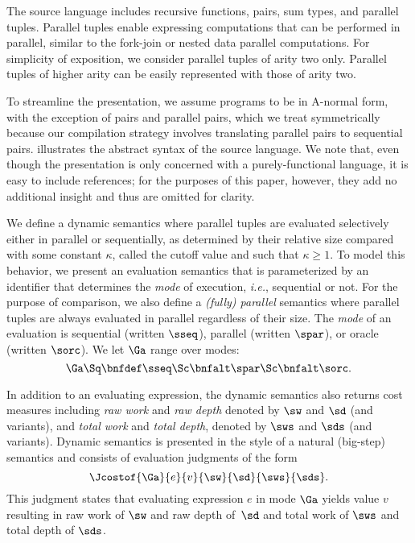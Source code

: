 The source language includes recursive functions, pairs, sum types,
and parallel tuples.  Parallel tuples enable expressing computations
that can be performed in parallel, similar to the fork-join or nested
data parallel computations.  For simplicity of exposition, we consider
parallel tuples of arity two only.  Parallel tuples of higher arity
can be easily represented with those of arity two.  


To streamline the presentation, we assume programs to be in A-normal
form, with the exception of pairs and parallel pairs, which we treat
symmetrically because our compilation strategy involves translating
parallel pairs to sequential pairs.   illustrates
the abstract syntax of the source language. We note that, even though
the presentation is only concerned with a purely-functional language,
it is easy to include references; for the purposes of this paper,
however, they add no additional insight and thus are omitted for
clarity.


We define a dynamic semantics where parallel tuples are evaluated
selectively either in parallel or sequentially, as determined by their
relative size compared with some constant $\kappa$, called the cutoff
value and such that $\kappa \geq 1$. To model this behavior, we
present an evaluation semantics that is parameterized by an identifier
that determines the {\em mode} of execution, \textit{i.e.}, sequential or
not. For the purpose of comparison, we also define a {\em (fully)
  parallel} semantics where parallel tuples are always evaluated in
parallel regardless of their size.  The {\em mode} of an evaluation is
sequential (written $\sseq$), parallel (written $\spar$), or oracle
(written $\sorc$).  We let $\Ga$ range over modes:
$$\Ga \Sq\bnfdef \sseq \Sc\bnfalt \spar \Sc\bnfalt \sorc.$$

In addition to an evaluating expression, the dynamic semantics also
returns cost measures including {\em raw work} and {\em raw depth}
denoted by $\sw$ and $\sd$ (and variants), and {\em total work} and {\em
  total depth}, denoted by $\sws$ and $\sds$ (and variants).  Dynamic
semantics is presented in the style of a natural (big-step) semantics
and consists of evaluation judgments of the form
$$\Jcostof{\Ga}{ e }{v}{\sw}{\sd}{\sws}{\sds}.$$ 
This judgment states
that evaluating expression $e$ in mode $\Ga$ yields value $v$
resulting in raw work of $\sw$ and raw depth of~$\sd$ and total work
of $\sws$ and total depth of $\sds$.  

